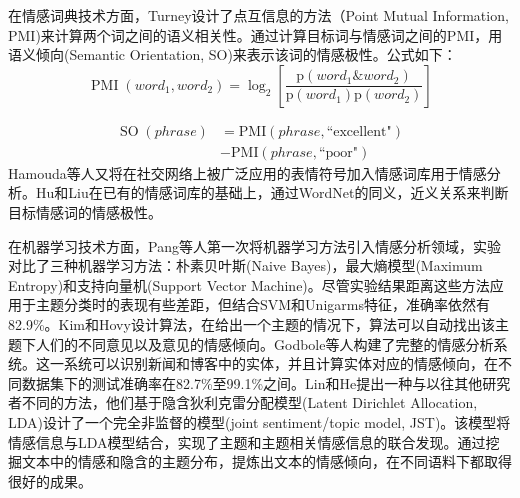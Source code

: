 在情感词典技术方面，Turney\cite{10.3115/1073083.1073153}设计了点互信息的方法（Point Mutual Information, PMI)来计算两个词之间的语义相关性。通过计算目标词与情感词之间的PMI，用语义倾向(Semantic Orientation, SO)来表示该词的情感极性。公式如下：
\begin{equation}
\operatorname{PMI}\left(word_1, word_2\right)=\log _{2}\left[\frac{\mathrm{p}\left(word_1 \& word_2\right)}{\mathrm{p}\left(word_1\right) \mathrm{p}\left(word_2\right)}\right]\label{eq:PMI}
\end{equation}

\begin{equation}
\begin{aligned}
\operatorname{SO}\left(phrase\right) &=\mathrm{PMI}\left(phrase, \text{``excellent"}\right) \\
&-\mathrm{PMI}\left(phrase, \text{``poor"}\right)
\end{aligned}
\end{equation}
Hamouda等\cite{hamouda2013social}人又将在社交网络上被广泛应用的表情符号加入情感词库用于情感分析。Hu和Liu\cite{hu2004mining}在已有的情感词库的基础上，通过WordNet的同义，近义关系来判断目标情感词的情感极性。

在机器学习技术方面，Pang等\cite{pang2002thumbs}人第一次将机器学习方法引入情感分析领域，实验对比了三种机器学习方法：朴素贝叶斯(Naive Bayes)，最大熵模型(Maximum Entropy)和支持向量机(Support Vector Machine)。尽管实验结果距离这些方法应用于主题分类时的表现有些差距，但结合SVM和Unigarms特征，准确率依然有82.9\%。Kim和Hovy\cite{kim2004determining}设计算法，在给出一个主题的情况下，算法可以自动找出该主题下人们的不同意见以及意见的情感倾向。Godbole等\cite{godbole2007large}人构建了完整的情感分析系统。这一系统可以识别新闻和博客中的实体，并且计算实体对应的情感倾向，在不同数据集下的测试准确率在82.7\%至99.1\%之间。Lin和He\cite{chenghualin}提出一种与以往其他研究者不同的方法，他们基于隐含狄利克雷分配模型(Latent Dirichlet Allocation, LDA)设计了一个完全非监督的模型(joint sentiment/topic model, JST)。该模型将情感信息与LDA模型结合，实现了主题和主题相关情感信息的联合发现。通过挖掘文本中的情感和隐含的主题分布，提炼出文本的情感倾向，在不同语料下都取得很好的成果。

